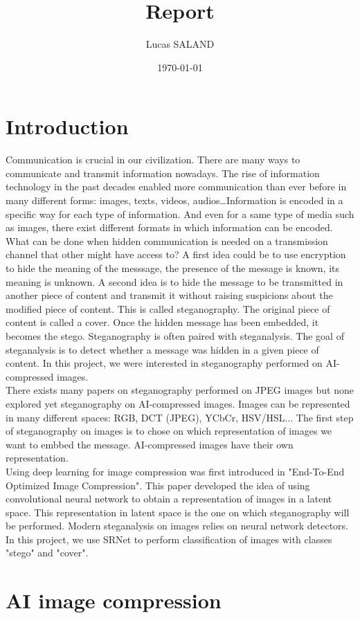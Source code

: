 \documentclass[12pt]{article}
\title{Report}
\author{Lucas SALAND}
\date{\today}
\begin{document}

\tableofcontents
\listoffigures
\listoftables
\section{Introduction}
Communication is crucial in our civilization. There are many ways to communicate and transmit information nowadays. The rise of information technology in the past decades enabled more communication than ever before in many different forms: images, texts, videos, audios\dots Information is encoded in a specific way for each type of information. And even for a same type of media such as images, there exist different formats in which information can be encoded. What can be done when hidden communication is needed on a transmission channel that other might have access to? A first idea could be to use encryption to hide the meaning of the messsage, the presence of the message is known, its meaning is unknown.  A second idea is to hide the message to be transmitted in another piece of content and transmit it without raising suspicions about the modified piece of content. This is called steganography. The original piece of content is called a cover. Once the hidden message has been embedded, it becomes the stego. Steganography is often paired with steganalysis. The goal of steganalysis is to detect whether a message was hidden in a given piece of content. In this project, we were interested in steganography performed on AI-compressed images.\\
There exists many papers on steganography performed on JPEG images but none explored yet steganography on AI-compressed images. Images can be represented in many different spaces: RGB, DCT (JPEG), YCbCr, HSV/HSL... The first step of steganography on images is to chose on which representation of images we want to embbed the message. AI-compressed images have their own representation.\\
Using deep learning for image compression was first introduced in "End-To-End Optimized Image Compression". This paper developed the idea of using convolutional neural network to obtain a representation of images in a latent space. This representation in latent space is the one on which steganography will be performed. Modern steganalysis on images relies on neural network detectors. In this project, we use SRNet to perform classification of images with classes "stego" and "cover".

\section{AI image compression}
\end{document}
